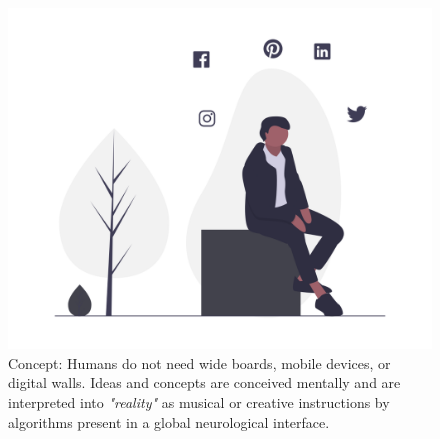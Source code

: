 \documentclass[sigchi]{acmart}
\begin{document}
\begin{figure}[h]
  \centering
  \includegraphics[width=\linewidth]{acmart-master-2/samples/thinkbnw.png}
  \caption{Concept: Humans do not need wide boards, mobile devices, or digital walls. Ideas and concepts are conceived mentally and are interpreted into \textit{"reality"} as musical or creative instructions by algorithms present in a global neurological interface. }
  \label{fig: think}
\end{figure}
\end{document}
